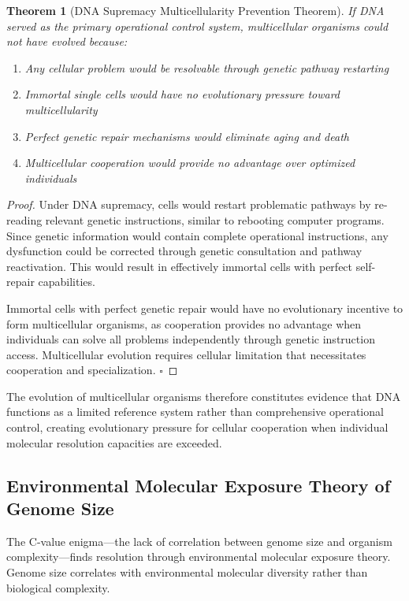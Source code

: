 \documentclass[12pt,a4paper]{article}
\newtheorem{theorem}{Theorem}[section]
\begin{document}
\begin{theorem}[DNA Supremacy Multicellularity Prevention Theorem]
If DNA served as the primary operational control system, multicellular organisms could not have evolved because:
\begin{enumerate}
\item Any cellular problem would be resolvable through genetic pathway restarting
\item Immortal single cells would have no evolutionary pressure toward multicellularity  
\item Perfect genetic repair mechanisms would eliminate aging and death
\item Multicellular cooperation would provide no advantage over optimized individuals
\end{enumerate}
\end{theorem}

\begin{proof}
Under DNA supremacy, cells would restart problematic pathways by re-reading relevant genetic instructions, similar to rebooting computer programs. Since genetic information would contain complete operational instructions, any dysfunction could be corrected through genetic consultation and pathway reactivation. This would result in effectively immortal cells with perfect self-repair capabilities.

Immortal cells with perfect genetic repair would have no evolutionary incentive to form multicellular organisms, as cooperation provides no advantage when individuals can solve all problems independently through genetic instruction access. Multicellular evolution requires cellular limitation that necessitates cooperation and specialization. $\square$
\end{proof}

The evolution of multicellular organisms therefore constitutes evidence that DNA functions as a limited reference system rather than comprehensive operational control, creating evolutionary pressure for cellular cooperation when individual molecular resolution capacities are exceeded.

\subsection{Environmental Molecular Exposure Theory of Genome Size}

The C-value enigma—the lack of correlation between genome size and organism complexity—finds resolution through environmental molecular exposure theory. Genome size correlates with environmental molecular diversity rather than biological complexity.
\end{document}
